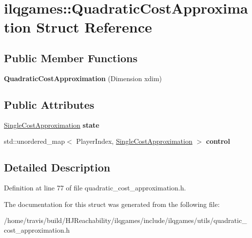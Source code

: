 \hypertarget{structilqgames_1_1_quadratic_cost_approximation}{}\section{ilqgames\+:\+:Quadratic\+Cost\+Approximation Struct Reference}
\label{structilqgames_1_1_quadratic_cost_approximation}
\subsection*{Public Member Functions}
\begin{DoxyCompactItemize}
\item 
{\bfseries Quadratic\+Cost\+Approximation} (Dimension xdim)\hypertarget{structilqgames_1_1_quadratic_cost_approximation_af7493609c0dbfb52beb6ec7b41f5a064}{}\label{structilqgames_1_1_quadratic_cost_approximation_af7493609c0dbfb52beb6ec7b41f5a064}

\end{DoxyCompactItemize}
\subsection*{Public Attributes}
\begin{DoxyCompactItemize}
\item 
\hyperlink{structilqgames_1_1_single_cost_approximation}{Single\+Cost\+Approximation} {\bfseries state}\hypertarget{structilqgames_1_1_quadratic_cost_approximation_a9a1ba94f8eb8f4c7bf22233feab63b15}{}\label{structilqgames_1_1_quadratic_cost_approximation_a9a1ba94f8eb8f4c7bf22233feab63b15}

\item 
std\+::unordered\+\_\+map$<$ Player\+Index, \hyperlink{structilqgames_1_1_single_cost_approximation}{Single\+Cost\+Approximation} $>$ {\bfseries control}\hypertarget{structilqgames_1_1_quadratic_cost_approximation_aa39cc7796517e7333e43675ddf162881}{}\label{structilqgames_1_1_quadratic_cost_approximation_aa39cc7796517e7333e43675ddf162881}

\end{DoxyCompactItemize}


\subsection{Detailed Description}


Definition at line 77 of file quadratic\+\_\+cost\+\_\+approximation.\+h.



The documentation for this struct was generated from the following file\+:\begin{DoxyCompactItemize}
\item 
/home/travis/build/\+H\+J\+Reachability/ilqgames/include/ilqgames/utils/quadratic\+\_\+cost\+\_\+approximation.\+h\end{DoxyCompactItemize}
